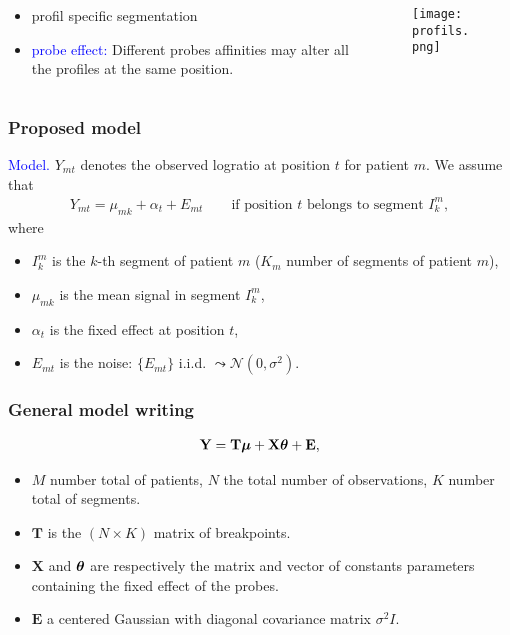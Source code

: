 \documentclass[compress]{beamer}
\newcommand{\mubf}{\text{\mathversion{bold}{$\mu$}}}
\newcommand{\thetabf}{\text{\mathversion{bold}{$\theta$}}}
\newcommand{\Ybf}{\textbf{Y}}
\newcommand{\Xbf}{\textbf{X}}
\newcommand{\Ebf}{\textbf{E}}
\newcommand{\Tbf}{\textbf{T}}
\begin{document}
\begin{frame}
\begin{columns}
\begin{column}{4cm}
\begin{itemize}
\item profil specific segmentation
\item\textcolor{blue}{probe effect:} Different probes affinities may alter all the profiles at the same position.
\end{itemize}
\end{column}
\begin{column}{8cm}
\begin{figure}
\texttt{[image: profils.png]}
\end{figure}
\end{column}
\end{columns}
\end{frame}


\begin{frame}
\frametitle{Proposed model}
\textcolor{blue}{Model.} $Y_{m t}$ denotes the observed logratio at position $t$
for patient $m$. We assume that
\begin{eqnarray*}
Y_{m t} = \mu_{mk} + \alpha_{t} + E_{mt} \qquad \mbox{if
position $t$ belongs to segment $I_{ k}^m$},
\end{eqnarray*}
where
\begin{itemize}
\item $I_{k}^m$ is the $k$-th segment of patient
  $m$ ($K_m$ number of segments of patient $m$),
\item  $\mu_{mk}$ is the mean signal in segment
  $I_{k}^m$,
\item  $\alpha_{t}$ is the fixed effect at position $t$,
\item $E_{m t}$ is the noise: $\{E_{mt}\}$
  i.i.d. $\leadsto \mathcal{N}(0, \sigma^2)$.
\end{itemize}
\end{frame}






\begin{frame}
\frametitle{General model writing}
\begin{eqnarray*}
\Ybf=\Tbf\mubf+\Xbf\thetabf+\Ebf,
\end{eqnarray*}
\begin{itemize}
\item $M$ number total of patients, $N$ the total number of observations, $K$ number total of segments.
\item $\Tbf$ is the $(N\times K)$ matrix of breakpoints.
\item $\Xbf$ and $\thetabf$ are respectively  the matrix and vector of constants parameters containing the fixed effect of the probes.
\item $\Ebf$ a centered Gaussian with diagonal covariance matrix $\sigma^2I$.
\end{itemize}
\end{frame}
\end{document}
